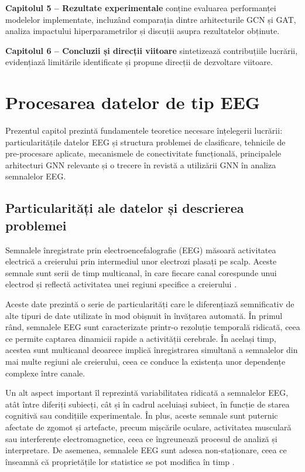 \documentclass[12pt,a4paper]{report}
\theoremstyle{definition}
\theoremstyle{remark}
\begin{document}
\textbf{Capitolul 5 -- Rezultate experimentale} conține evaluarea performanței modelelor implementate, incluzând comparația dintre arhitecturile GCN și GAT, analiza impactului hiperparametrilor și discuții asupra rezultatelor obținute.

\textbf{Capitolul 6 -- Concluzii și direcții viitoare} sintetizează contribuțiile lucrării, evidențiază limitările identificate și propune direcții de dezvoltare viitoare.

\chapter{Procesarea datelor de tip EEG}

Prezentul capitol prezintă fundamentele teoretice necesare înțelegerii lucrării: par\-ti\-cu\-la\-ri\-tă\-ți\-le datelor EEG și structura problemei de clasificare, tehnicile de pre-procesare aplicate, mecanismele de conectivitate funcțională, principalele arhitecturi GNN relevante și o trecere în revistă a utilizării GNN în analiza semnalelor EEG.

\section{Particularități ale datelor și descrierea problemei}

Semnalele înregistrate prin electroencefalografie (EEG) măsoară activitatea electrică a creierului prin intermediul unor electrozi plasați pe scalp. Aceste semnale sunt serii de timp multicanal, în care fiecare canal corespunde unui electrod și reflectă activitatea unei regiuni specifice a creierului \cite{klepl2023gnn}.

Aceste date prezintă o serie de particularități care le diferențiază semnificativ de alte tipuri de date utilizate în mod obișnuit în învățarea automată. În primul rând, semnalele EEG sunt caracterizate printr-o rezoluție temporală ridicată, ceea ce permite captarea dinamicii rapide a activității cerebrale. În același timp, acestea sunt multicanal deoarece implică înregistrarea simultană a semnalelor din mai multe regiuni ale creierului, ceea ce conduce la existența unor dependențe complexe între canale.

Un alt aspect important îl reprezintă variabilitatea ridicată a semnalelor EEG, atât între diferiți subiecți, cât și în cadrul aceluiași subiect, în funcție de starea cognitivă sau condițiile experimentale. În plus, aceste semnale sunt puternic afectate de zgomot și artefacte, precum mișcările oculare, activitatea musculară sau interferențe electromagnetice, ceea ce îngreunează procesul de analiză și interpretare. De asemenea, semnalele EEG sunt adesea non-staționare, ceea ce înseamnă că proprietățile lor statistice se pot modifica în timp \cite{awais2024graphical}.
\end{document}
